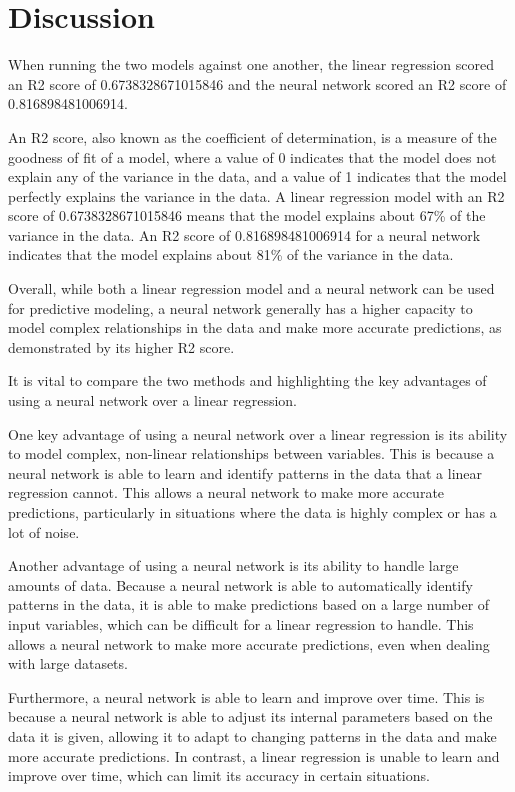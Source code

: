 \documentclass[11pt]{article}
\begin{document}
\section{Discussion}
When running the two models against one another, the linear regression scored an R2 score of 0.6738328671015846 and the neural network scored an R2 score of 0.816898481006914.

An R2 score, also known as the coefficient of determination, is a measure of the goodness of fit of a model, where a value of 0 indicates that the model does not explain any of the variance in the data, and a value of 1 indicates that the model perfectly explains the variance in the data. A linear regression model with an R2 score of 0.6738328671015846 means that the model explains about 67\% of the variance in the data. An R2 score of 0.816898481006914 for a neural network indicates that the model explains about 81\% of the variance in the data.

Overall, while both a linear regression model and a neural network can be used for predictive modeling, a neural network generally has a higher capacity to model complex relationships in the data and make more accurate predictions, as demonstrated by its higher R2 score.

It is vital to compare the two methods and highlighting the key advantages of using a neural network over a linear regression.

One key advantage of using a neural network over a linear regression is its ability to model complex, non-linear relationships between variables. This is because a neural network is able to learn and identify patterns in the data that a linear regression cannot. This allows a neural network to make more accurate predictions, particularly in situations where the data is highly complex or has a lot of noise.

Another advantage of using a neural network is its ability to handle large amounts of data. Because a neural network is able to automatically identify patterns in the data, it is able to make predictions based on a large number of input variables, which can be difficult for a linear regression to handle. This allows a neural network to make more accurate predictions, even when dealing with large datasets.

Furthermore, a neural network is able to learn and improve over time. This is because a neural network is able to adjust its internal parameters based on the data it is given, allowing it to adapt to changing patterns in the data and make more accurate predictions. In contrast, a linear regression is unable to learn and improve over time, which can limit its accuracy in certain situations.
\end{document}
